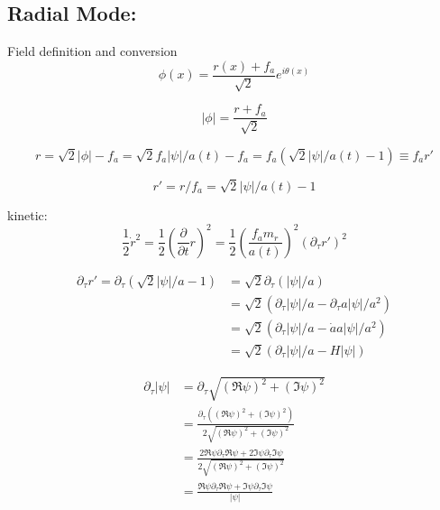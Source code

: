 \documentclass[a4paper]{article}
\begin{document}
\subsection{Radial Mode:}

Field definition and conversion
\begin{equation}
    \phi(x) = \frac{r(x) + f_a}{\sqrt{2}} e^{i \theta(x) }
\end{equation}

\begin{equation}
    |\phi| = \frac{r + f_a}{\sqrt{2}}
\end{equation}

\begin{equation}
    r = \sqrt{2} |\phi| - f_a
    = \sqrt{2} f_a |\psi| / a(t) - f_a
    = f_a \left( \sqrt{2} |\psi| / a(t) - 1 \right)
    \equiv f_a r'
\end{equation}

\begin{equation}
    r' = r / f_a = \sqrt{2} |\psi| / a(t) - 1
\end{equation}

kinetic:
\begin{equation}
    \frac{1}{2} \dot{r}^2 = \frac{1}{2} (\frac{\partial}{\partial t} r)^2
    = \frac{1}{2} (\frac{f_a m_r}{a(t)})^2 \left( \partial_\tau r' \right)^2
\end{equation}

\begin{align}
    \partial_\tau r' = \partial_\tau \left( \sqrt{2} |\psi| / a - 1 \right)
    &= \sqrt{2} \partial_\tau ( |\psi| / a ) \\
    &= \sqrt{2} (\partial_\tau |\psi| / a - \partial_\tau a |\psi| / a^2) \\
    &= \sqrt{2} (\partial_\tau |\psi| / a - \dot{a} a |\psi| / a^2) \\
    &= \sqrt{2} (\partial_\tau |\psi| / a - H |\psi|)
\end{align}

\begin{align}
    \partial_\tau |\psi| &= \partial_\tau \sqrt{ (\Re \psi)^2 + (\Im \psi)^2 } \\
                         &= \frac{ \partial_\tau ((\Re \psi)^2 + (\Im \psi)^2) }{ 2 \sqrt{ (\Re \psi)^2 + (\Im \psi)^2 } } \\
                         &= \frac{ 2 \Re \psi \partial_\tau \Re \psi + 2 \Im \psi \partial_\tau \Im \psi }{ 2 \sqrt{ (\Re \psi)^2 + (\Im \psi)^2 } } \\
                         &= \frac{ \Re \psi \partial_\tau \Re \psi + \Im \psi \partial_\tau \Im \psi }{ |\psi| }
\end{align}
\end{document}
